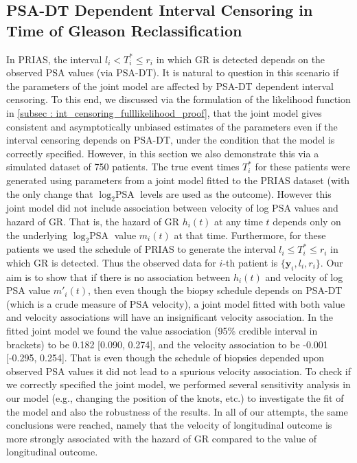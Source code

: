 \clearpage
\subsection{PSA-DT Dependent Interval Censoring in Time of Gleason Reclassification}
In PRIAS, the interval $l_i < T_i^* \leq r_i$ in which GR is detected depends on the observed PSA values (via PSA-DT). It is natural to question in this scenario if the parameters of the joint model are affected by PSA-DT dependent interval censoring. To this end, we discussed via the formulation of the likelihood function in \ref{subsec : int_censoring_fulllikelihood_proof}, that the joint model gives consistent and asymptotically unbiased estimates of the parameters even if the interval censoring depends on PSA-DT, under the condition that the model is correctly specified. However, in this section we also demonstrate this via a simulated dataset of 750 patients. The true event times $T^*_i$ for these patients were generated using parameters from a joint model fitted to the PRIAS dataset (with the only change that $\log_2 \mbox{PSA}$ levels are used as the outcome). However this joint model did not include association between velocity of log PSA values and hazard of GR. That is, the hazard of GR $h_i(t)$ at any time $t$ depends only on the underlying $\log_2 \mbox{PSA}$ value $m_i(t)$ at that time. Furthermore, for these patients we used the schedule of PRIAS to generate the interval $l_i \leq T^*_i \leq r_i$ in which GR is detected. Thus the observed data for $i$-th patient is $\{\boldsymbol{y}_i, l_i, r_i\}$. Our aim is to show that if there is no association between $h_i(t)$ and velocity of log PSA value $m'_i(t)$, then even though the biopsy schedule depends on PSA-DT (which is a crude measure of PSA velocity), a joint model fitted with both value and velocity associations will have an insignificant velocity association. In the fitted joint model we found the value association (95\% credible interval in brackets) to be 0.182 [0.090, 0.274], and the velocity association to be -0.001 [-0.295, 0.254]. That is even though the schedule of biopsies depended upon observed PSA values it did not lead to a spurious velocity association. To check if we correctly specified the joint model, we performed several sensitivity analysis in our model (e.g., changing the position of the knots, etc.) to investigate the fit of the model and also the robustness of the results. In all of our attempts, the same conclusions were reached, namely that the velocity of longitudinal outcome is more strongly associated with the hazard of GR compared to the value of longitudinal outcome.